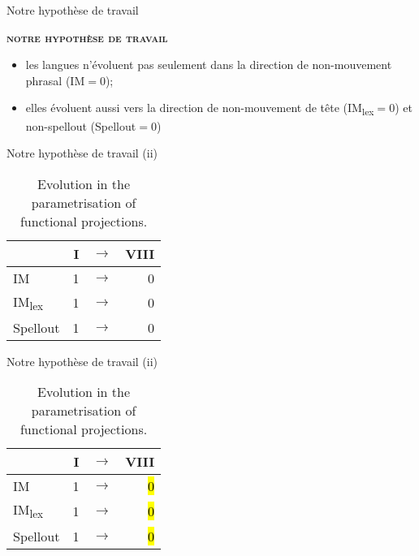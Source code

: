 \documentclass[lesson_slides]{subfiles}
\begin{document}
\begin{frame}[c]{Notre hypothèse de travail}

    \noindent \textbf{\textsc{notre hypothèse de travail}} \pause
    \begin{itemize}
        \item[\ding{227}] les langues n'évoluent pas seulement dans la direction de non-mouvement phrasal (IM$=$0); \pause
        \item[\ding{227}] elles évoluent aussi vers la direction de non-mouvement de tête (IM\textsubscript{lex}$=$0) et non-spellout (Spellout$=$0) 
    \end{itemize}
  
\end{frame}
\begin{frame}{Notre hypothèse de travail (ii)}

    \begin{table}[H]
    \centering
        \begin{tabular}{|l|r|r|r|}
        \hline
         & I & $\longrightarrow$ & VIII \\
        \hline
        IM & 1 & $\longrightarrow$ & 0 \\
        \hline
        IM\textsubscript{lex} & 1 & $\longrightarrow$ & 0 \\
        \hline
        Spellout & 1 & $\longrightarrow$ & 0 \\
        \hline
        \end{tabular}
    \caption{\label{tab:samp}Evolution in the parametrisation of functional projections.}
    \end{table}


\end{frame}
\begin{frame}{Notre hypothèse de travail (ii)}

    \begin{table}[H]
    \centering
        \begin{tabular}{|l|r|r|r|}
        \hline
         & I & $\longrightarrow$ & VIII \\
        \hline
        IM & 1 & $\longrightarrow$ & \hl{0} \\
        \hline
        IM\textsubscript{lex} & 1 & $\longrightarrow$ & \hl{0} \\
        \hline
        Spellout & 1 & $\longrightarrow$ & \hl{0} \\
        \hline
        \end{tabular}
    \caption{\label{tab:samp}Evolution in the parametrisation of functional projections.}
    \end{table}


\end{frame}
\end{document}
